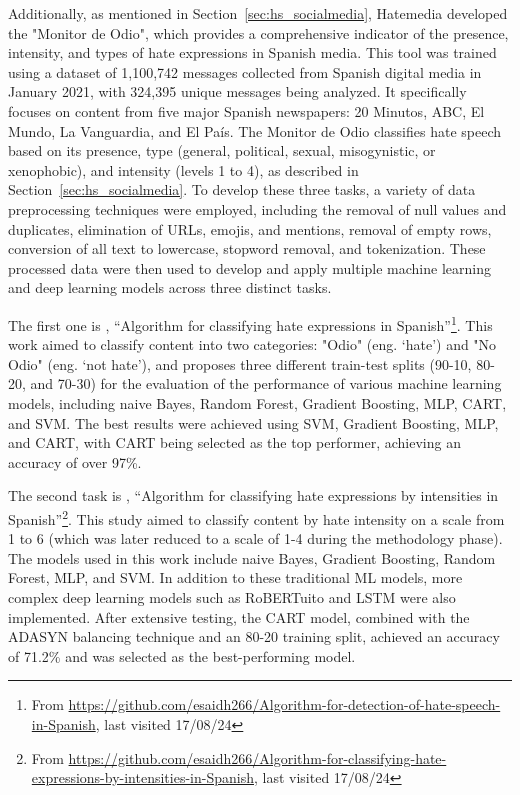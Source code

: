 Additionally, as mentioned in Section~\ref{sec:hs_socialmedia}, Hatemedia developed the "Monitor de Odio", which provides a comprehensive indicator of the presence, intensity, and types of hate expressions in Spanish media. This tool was trained using a dataset of 1,100,742 messages collected from Spanish digital media in January 2021, with 324,395 unique messages being analyzed. It specifically focuses on content from five major Spanish newspapers: 20 Minutos, ABC, El Mundo, La Vanguardia, and El País. The Monitor de Odio classifies hate speech based on its presence, type (general, political, sexual, misogynistic, or xenophobic), and intensity (levels 1 to 4), as described in Section~\ref{sec:hs_socialmedia}. To develop these three tasks, a variety of data preprocessing techniques were employed, including the removal of null values and duplicates, elimination of URLs, emojis, and mentions, removal of empty rows, conversion of all text to lowercase, stopword removal, and tokenization. These processed data were then used to develop and apply multiple machine learning and deep learning models across three distinct tasks.

The first one is \cite{degregorio-2024}, “Algorithm for classifying hate expressions in Spanish”\footnote{From \url{https://github.com/esaidh266/Algorithm-for-detection-of-hate-speech-in-Spanish}, last visited 17/08/24}. This work aimed to classify content into two categories: "Odio" (eng. `hate') and "No Odio" (eng. `not hate'), and proposes three different train-test splits (90-10, 80-20, and 70-30) for the evaluation of the performance of various machine learning models, including naive Bayes, Random Forest, Gradient Boosting, MLP, CART, and SVM. The best results were achieved using SVM, Gradient Boosting, MLP, and CART, with CART being selected as the top performer, achieving an accuracy of over 97\%. 

The second task is \cite{blanco-2024}, “Algorithm for classifying hate expressions by intensities in Spanish”\footnote{From \url{https://github.com/esaidh266/Algorithm-for-classifying-hate-expressions-by-intensities-in-Spanish}, last visited 17/08/24}. This study aimed to classify content by hate intensity on a scale from 1 to 6 (which was later reduced to a scale of 1-4 during the methodology phase). The models used in this work include naive Bayes, Gradient Boosting, Random Forest, MLP, and SVM. In addition to these traditional ML models, more complex deep learning models such as RoBERTuito \cite{perez-2023} and LSTM were also implemented. After extensive testing, the CART model, combined with the ADASYN balancing technique and an 80-20 training split, achieved an accuracy of 71.2\% and was selected as the best-performing model.

